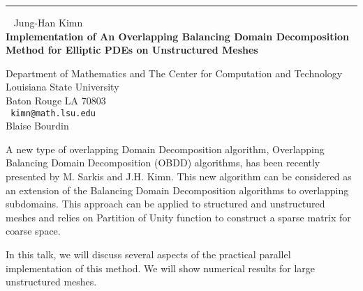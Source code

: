 \documentclass{report}
\begin{document}
\begin{center}

\rule{6in}{1pt} \
{\large
Jung-Han Kimn
\\ {\bf
Implementation of An Overlapping Balancing Domain Decomposition Method
for Elliptic PDEs on Unstructured Meshes
}}

Department of Mathematics and
The Center for Computation and Technology
\\
Louisiana State University
\\
Baton Rouge LA 70803
\\ {\tt
kimn@math.lsu.edu
}
\\
Blaise Bourdin
\end{center}

A new type of overlapping Domain Decomposition algorithm, Overlapping
Balancing Domain Decomposition (OBDD) algorithms, has been recently
presented by M. Sarkis and J.H. Kimn. This new algorithm can be
considered as an extension of the Balancing Domain Decomposition
algorithms to overlapping subdomains. This approach can be applied to
structured and unstructured meshes and relies on Partition of Unity
function to construct a sparse matrix for coarse space.

In this talk, we will discuss several aspects of the practical parallel
implementation of this method. We will show numerical results for large
unstructured meshes.
\end{document}
